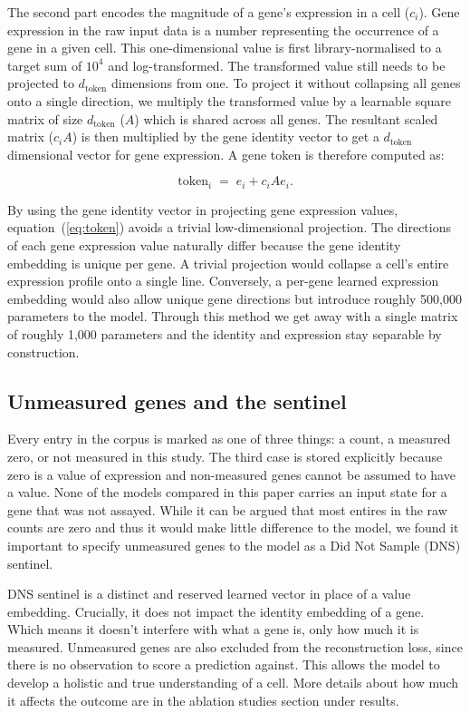 The second part encodes the magnitude of a gene's expression in a cell 
($c_i$). Gene expression in the raw input data is a number representing 
the occurrence of a gene in a given cell. This one-dimensional value is 
first library-normalised to a target sum of $10^4$ and log-transformed. 
The transformed value still needs to be projected to $d_{\text{token}}$
dimensions from one. To project it without collapsing all genes onto a 
single direction, we multiply the transformed value by a learnable 
square matrix of size $d_{\text{token}}$ ($A$) which is shared across 
all genes. The resultant scaled matrix ($c_i A$) is then multiplied by 
the gene identity vector to get a $d_{\text{token}}$ dimensional vector 
for gene expression. A gene token is therefore computed as:

\begin{equation}
\text{token}_i \;=\; e_i + c_i A e_i .
\label{eq:token}
\end{equation}

By using the gene identity vector in projecting gene expression values,
equation~(\ref{eq:token}) avoids a trivial low-dimensional projection. The directions
of each gene expression value naturally differ because the gene identity
embedding is unique per gene. A trivial projection would collapse a
cell's entire expression profile onto a single line. Conversely, a 
per-gene learned expression embedding would also allow unique gene 
directions but introduce roughly 500{,}000 parameters to the model. 
Through this method we get away with a single matrix of roughly 1{,}000 
parameters and the identity and expression stay separable by construction.


\subsection*{Unmeasured genes and the sentinel}

Every entry in the corpus is marked as one of three things: a count, a 
measured zero, or not measured in this study. The third case is stored 
explicitly because zero is a value of expression and non-measured genes
cannot be assumed to have a value. None of the models compared in this paper 
carries an input state for a gene that was not assayed. While it can be 
argued that most entires in the raw counts are zero and thus it would 
make little difference to the model, we found it important to specify 
unmeasured genes to the model as a Did Not Sample (DNS) sentinel.

DNS sentinel is a distinct and reserved learned vector in place of a 
value embedding. Crucially, it does not impact the identity embedding of a 
gene. Which means it doesn't interfere with what a gene is, only how much it 
is measured. Unmeasured genes are also excluded from the reconstruction loss, 
since there is no observation to score a prediction against. This allows the 
model to develop a holistic and true understanding of a cell. More details 
about how much it affects the outcome are in the ablation studies section 
under results.


